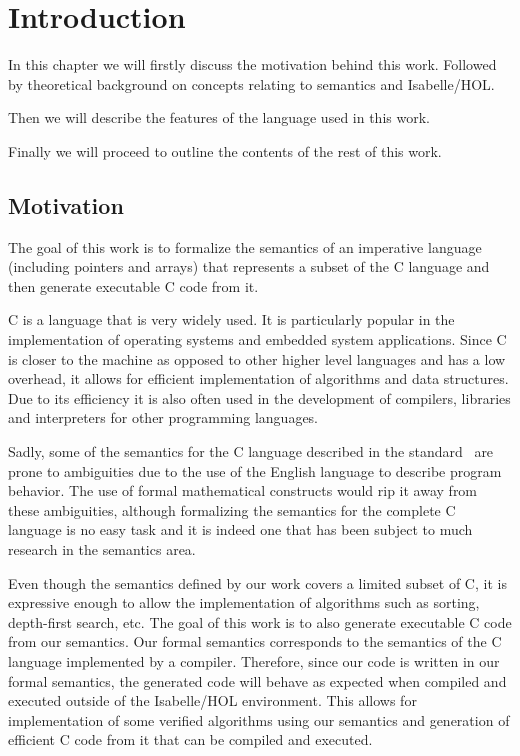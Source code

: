 \chapter{Introduction}\label{chapter:introduction}

In this chapter we will firstly discuss the motivation behind this work.
Followed by theoretical background on concepts relating to semantics and Isabelle/HOL.

Then we will describe the features of the language used in this work.

Finally we will proceed to outline the contents of the rest of this work.

\section{Motivation}

The goal of this work is to formalize the semantics of an imperative language (including pointers and arrays) that represents a subset of the C language and then generate executable C code from it.

C is a language that is very widely used.
It is particularly popular in the implementation of operating systems and embedded system applications.
Since C is closer to the machine as opposed to other higher level languages and has a low overhead, it allows for efficient implementation of algorithms and data structures.
Due to its efficiency it is also often used in the development of compilers, libraries and interpreters for other programming languages.

Sadly, some of the semantics for the C language described in the standard~\parencite{c99} are prone to ambiguities due to the use of the English language to describe program behavior.
The use of formal mathematical constructs would rip it away from these ambiguities, although formalizing the semantics for the complete C language is no easy task and it is indeed one that has been subject to much research in the semantics area.

Even though the semantics defined by our work covers a limited subset of C, it is expressive enough to allow the implementation of algorithms such as sorting, depth-first search, etc.
The goal of this work is to also generate executable C code from our semantics.
Our formal semantics corresponds to the semantics of the C language implemented by a compiler.
Therefore, since our code is written in our formal semantics, the generated code will behave as expected when compiled and executed outside of the Isabelle/HOL environment.
This allows for implementation of some verified algorithms using our semantics and generation of efficient C code from it that can be compiled and executed.

